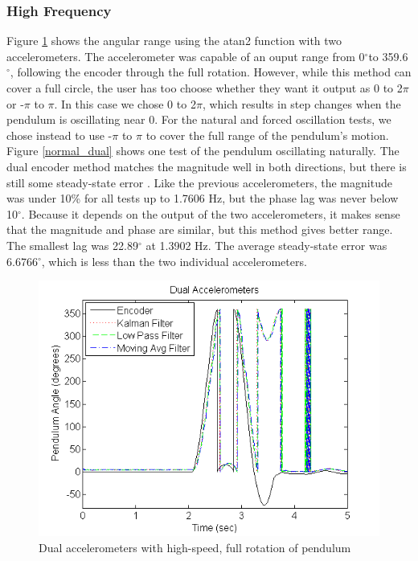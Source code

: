 \documentclass{article}
\theoremstyle{plain}
\theoremstyle{definition}
\theoremstyle{remark}
\begin{document}
\subsubsection{High Frequency}

Figure \ref{full_Dual} shows the angular range using the atan2 function with two accelerometers. The accelerometer was capable of an ouput range from 0$^{\circ}$to 359.6$^{\circ}$, following the encoder through the full rotation. However, while this method can cover a full circle, the user has too choose whether they want it output as 0 to 2$\pi$ or -$\pi$ to $\pi$. In this case we chose 0 to 2$\pi$, which results in step changes when the pendulum is oscillating near 0. For the natural and forced oscillation tests, we chose instead to use -$\pi$ to $\pi$ to cover the full range of the pendulum's motion. \\

Figure \ref{normal_dual} shows one test of the pendulum oscillating naturally. The dual encoder method matches the magnitude well in both directions, but there is still some steady-state error . Like the previous accelerometers, the magnitude was under 10\% for all tests up to 1.7606 Hz, but the phase lag was never below 10$^{\circ}$. Because it depends on the output of the two accelerometers, it makes sense that the magnitude and phase are similar, but this method gives better range. The smallest lag was 22.89$^{\circ}$ at 1.3902 Hz. The average steady-state error was 6.6766$^{\circ}$, which is less than the two individual accelerometers.\\ 

\begin{figure}[hbt]
\begin{center}
\includegraphics[width = 12cm]{FullRotation_Dual.png}
\caption{Dual accelerometers with high-speed, full rotation of pendulum}
\label{full_Dual}
\end{center}
\end{figure}
\end{document}
